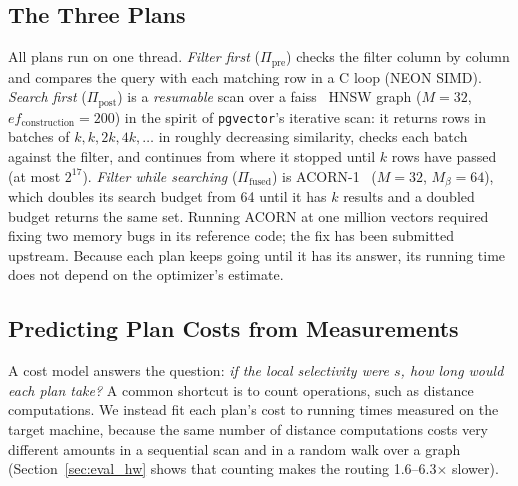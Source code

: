 \documentclass[sigconf, nonacm]{acmart}
\newcommand{\Ppre}{\Pi_{\text{pre}}}
\newcommand{\Pfus}{\Pi_{\text{fused}}}
\newcommand{\Ppost}{\Pi_{\text{post}}}
\begin{document}
\subsection{The Three Plans}\label{sec:plans}
All plans run on one thread. \emph{Filter first} ($\Ppre$) checks the filter column by column and compares the query with each matching row in a C loop (NEON SIMD). \emph{Search first} ($\Ppost$) is a \emph{resumable} scan over a faiss~\cite{douze2024faiss} HNSW graph ($M=32$, $ef_{\text{construction}}=200$) in the spirit of \texttt{pgvector}'s iterative scan: it returns rows in batches of $k, k, 2k, 4k, \ldots$ in roughly decreasing similarity, checks each batch against the filter, and continues from where it stopped until $k$ rows have passed (at most $2^{17}$). \emph{Filter while searching} ($\Pfus$) is ACORN-1~\cite{patel2024acorn} ($M=32$, $M_\beta=64$), which doubles its search budget from 64 until it has $k$ results and a doubled budget returns the same set. Running ACORN at one million vectors required fixing two memory bugs in its reference code; the fix has been submitted upstream. Because each plan keeps going until it has its answer, its running time does not depend on the optimizer's estimate.

\subsection{Predicting Plan Costs from Measurements}\label{sec:costs}\label{sec:routing}
A cost model answers the question: \emph{if the local selectivity were $s$, how long would each plan take?} A common shortcut is to count operations, such as distance computations. We instead fit each plan's cost to running times measured on the target machine, because the same number of distance computations costs very different amounts in a sequential scan and in a random walk over a graph (Section~\ref{sec:eval_hw} shows that counting makes the routing 1.6--6.3$\times$ slower).
\end{document}
